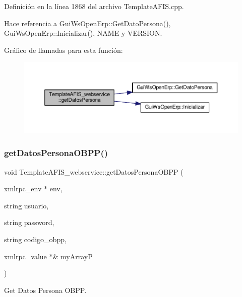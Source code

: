 Definición en la línea 1868 del archivo Template\+A\+F\+I\+S.\+cpp.



Hace referencia a Gui\+Ws\+Open\+Erp\+::\+Get\+Dato\+Persona(), Gui\+Ws\+Open\+Erp\+::\+Inicializar(), N\+A\+ME y V\+E\+R\+S\+I\+ON.

Gráfico de llamadas para esta función\+:\nopagebreak
\begin{figure}[H]
\begin{center}
\leavevmode
\includegraphics[width=350pt]{classTemplateAFIS__webservice_a096dfa38545612233dbb64006b01f3e3_cgraph}
\end{center}
\end{figure}
\hypertarget{classTemplateAFIS__webservice_adc47efe142e56d2899f8eb8da72ab8eb}{}\label{classTemplateAFIS__webservice_adc47efe142e56d2899f8eb8da72ab8eb} 
\subsubsection{\texorpdfstring{get\+Datos\+Persona\+O\+B\+P\+P()}{getDatosPersonaOBPP()}}
{\footnotesize\ttfamily void Template\+A\+F\+I\+S\+\_\+webservice\+::get\+Datos\+Persona\+O\+B\+PP (\begin{DoxyParamCaption}\item[{xmlrpc\+\_\+env $\ast$}]{env,  }\item[{string}]{usuario,  }\item[{string}]{password,  }\item[{string}]{codigo\+\_\+obpp,  }\item[{xmlrpc\+\_\+value $\ast$\&}]{my\+ArrayP }\end{DoxyParamCaption})}



Get Datos Persona O\+B\+PP. 


